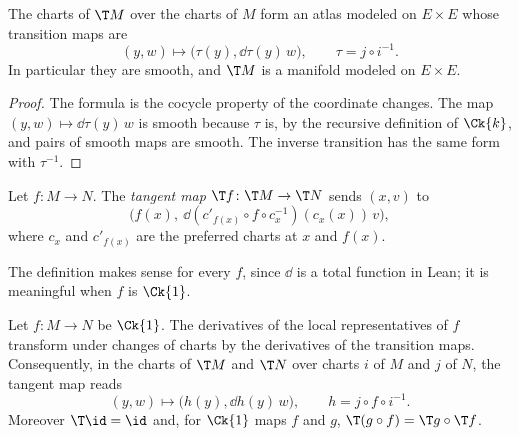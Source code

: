\begin{theorem}[$\T M$ is a manifold]
  \label{thm:man-tangent-manifold}
  \leanok
  The charts of $\T M$ over the charts of $M$ form an atlas modeled on $E \times E$ whose
  transition maps are
  \[
    (y, w) \longmapsto \bigl(\tau(y), \dd\tau(y)\,w\bigr), \qquad \tau = j \circ i^{-1}.
  \]
  In particular they are smooth, and $\T M$ is a manifold modeled on $E \times E$.
\end{theorem}

\begin{proof}
  \leanok
  The formula is the cocycle property of the coordinate changes. The map $(y, w) \mapsto
  \dd\tau(y)\,w$ is smooth because $\tau$ is, by the recursive definition of $\Ck{k}$, and pairs of
  smooth maps are smooth. The inverse transition has the same form with $\tau^{-1}$.
\end{proof}

\begin{definition}
  \label{def:tangent-map}
  \leanok
  Let $f \colon M \to N$. The \emph{tangent map} $\T f \colon \T M \to \T N$ sends $(x, v)$ to
  \[
    \bigl(f(x),\ \dd(c'_{f(x)} \circ f \circ c_x^{-1})(c_x(x))\,v\bigr),
  \]
  where $c_x$ and $c'_{f(x)}$ are the preferred charts at $x$ and $f(x)$.
\end{definition}

The definition makes sense for every $f$, since $\dd$ is a total function in Lean; it is
meaningful when $f$ is $\Ck{1}$.

\begin{theorem}
  \label{thm:man-tangent-map}
  \leanok
  Let $f \colon M \to N$ be $\Ck{1}$. The derivatives of the local representatives of $f$
  transform under changes of charts by the derivatives of the transition maps. Consequently, in
  the charts of $\T M$ and $\T N$ over charts $i$ of $M$ and $j$ of $N$, the tangent map reads
  \[
    (y, w) \longmapsto \bigl(h(y), \dd h(y)\,w\bigr), \qquad h = j \circ f \circ i^{-1}.
  \]
  Moreover $\T\id = \id$ and, for $\Ck{1}$ maps $f$ and $g$, $\T(g \circ f) = \T g \circ \T f$.
\end{theorem}

